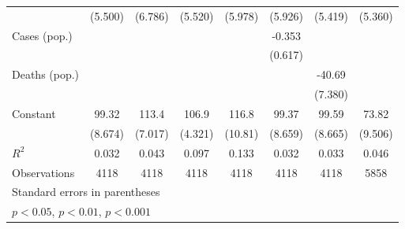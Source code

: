 \documentclass{article}
\begin{document}
{\begin{longtable}{l*{7}{c}}
                &  (5.500)         &  (6.786)         &  (5.520)         &  (5.978)         &  (5.926)         &  (5.419)         &  (5.360)         \\
Cases (pop.)    &                  &                  &                  &                  &   -0.353         &                  &                  \\
                &                  &                  &                  &                  &  (0.617)         &                  &                  \\
Deaths (pop.)   &                  &                  &                  &                  &                  &   -40.69\sym{***}&                  \\
                &                  &                  &                  &                  &                  &  (7.380)         &                  \\
Constant        &    99.32\sym{***}&    113.4\sym{***}&    106.9\sym{***}&    116.8\sym{***}&    99.37\sym{***}&    99.59\sym{***}&    73.82\sym{***}\\
                &  (8.674)         &  (7.017)         &  (4.321)         &  (10.81)         &  (8.659)         &  (8.665)         &  (9.506)         \\
\hline
\(R^{2}\)       &    0.032         &    0.043         &    0.097         &    0.133         &    0.032         &    0.033         &    0.046         \\
Observations    &     4118         &     4118         &     4118         &     4118         &     4118         &     4118         &     5858         \\
\hline\hline
\multicolumn{8}{l}{\footnotesize Standard errors in parentheses}\\
\multicolumn{8}{l}{\footnotesize \sym{*} \(p<0.05\), \sym{**} \(p<0.01\), \sym{***} \(p<0.001\)}\\
\end{longtable}
}
\end{document}
